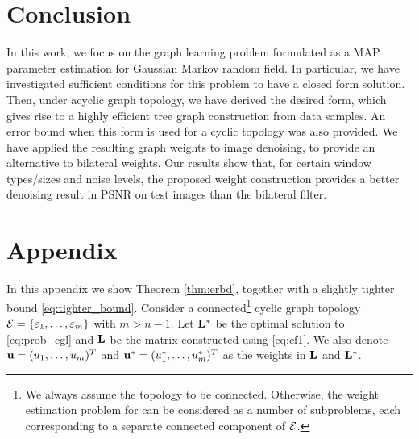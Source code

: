 \documentclass{article}
\begin{document}
\section{Conclusion}
\label{sec:conclusion}
In this work, we focus on the graph learning problem formulated as a MAP parameter estimation for Gaussian Markov random field. In particular, we have investigated sufficient conditions for this problem to have a closed form solution. Then, under acyclic graph topology, we have derived the desired form, which gives rise to a highly efficient tree graph construction from data samples. An error bound when this form is used for a cyclic topology was also provided. We have applied the resulting graph weights to image denoising, to provide an alternative to bilateral weights. Our results show that, for certain window types/sizes and noise levels, the proposed weight construction provides a better denoising result in PSNR on test images than the bilateral filter. 





\vfill\pagebreak

\section{Appendix}
In this appendix we show Theorem \ref{thm:erbd}, together with a slightly tighter bound \eqref{eq:tighter_bound}. Consider a connected\footnote{We always assume the topology to be connected. Otherwise, the weight estimation problem for can be considered as a number of subproblems, each corresponding to a separate connected component of ${\cal E}$.} cyclic graph topology ${\cal E}=\{\varepsilon_1,\dots,\varepsilon_m\}$ with $m>n-1$. Let ${\bf L}^*$ be the optimal solution to \eqref{eq:prob_cgl} and ${\bf L}$ be the matrix constructed using \eqref{eq:cf1}. We also denote ${\bf u}=(u_1,\dots,u_m)^T$ and ${\bf u}^*=(u_1^*,\dots,u_m^*)^T$ as the weights in ${\bf L}$ and ${\bf L}^*$. 
\end{document}
